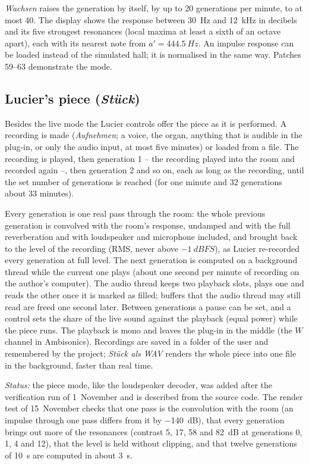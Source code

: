 \documentclass[11pt,a4paper,parskip=half,DIV=11,toc=bibliography]{scrartcl}
\newcommand{\ui}[1]{\emph{#1}}                 %
\begin{document}
\ui{Wachsen} raises the generation by itself, by up to 20 generations per minute, to at most 40. The
display shows the response between \SI{30}{Hz} and \SI{12}{kHz} in decibels and its five strongest resonances
(local maxima at least a sixth of an octave apart), each with its nearest note from $a'=\SI{444.5}{Hz}$. An
impulse response can be loaded instead of the simulated hall; it is normalised in the same way.
Patches 59--63 demonstrate the mode.

\subsection{Lucier's piece (\ui{Stück})}
\label{sec:lucierpiece}
Besides the live mode the Lucier controls offer the piece as it is performed. A recording is made
(\ui{Aufnehmen}; a voice, the organ, anything that is audible in the plug-in, or only the audio input,
at most five minutes) or loaded from a file. The recording is played, then generation 1 -- the recording
played into the room and recorded again --, then generation 2 and so on, each as long as the recording, until
the set number of generations is reached (for one minute and 32 generations about 33 minutes).

Every generation is one real pass through the room: the whole previous generation is convolved with the
room's response, undamped and with the full reverberation and with loudspeaker and microphone included, and
brought back to the level of the recording (RMS, never above $-\SI{1}{dBFS}$), as Lucier re-recorded every
generation at full level. The next generation is computed on a background thread while the current one
plays (about one second per minute of recording on the author's computer). The audio thread keeps two
playback slots, plays one and reads the other once it is marked as filled; buffers that the audio thread
may still read are freed one second later. Between generations a pause can be set, and a control
sets the share of the live sound against the playback (equal power) while the piece runs. The playback
is mono and leaves the plug-in in the middle (the $W$ channel in Ambisonics). Recordings are saved in
a folder of the user and remembered by the project; \ui{Stück als WAV} renders the whole piece into one
file in the background, faster than real time.

\emph{Status:} the piece mode, like the loudspeaker decoder, was added after the verification run of 1~November and is
described from the source code. The render test of 15~November checks that one pass is the convolution with the room (an impulse through one
pass differs from it by \SI{-140}{dB}), that every generation brings out more of the resonances (contrast 5, 17, 58 and \SI{82}{dB} at generations
0, 1, 4 and 12), that the level is held without clipping, and that twelve generations of \SI{10}{s} are computed in about \SI{3}{s}.
\end{document}
